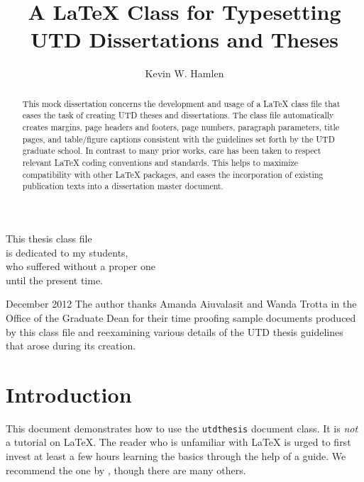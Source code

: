 \documentclass[doublespacing]{utdthesis}
\author{Kevin W. Hamlen}
\title{A LaTeX Class for Typesetting \\ UTD Dissertations and Theses}
\begin{document}
\frontmatter

\signaturepage
{} %

\begin{dedication} %
This thesis class file \\
is dedicated to my students, \\
who suffered without a proper one \\
until the present time.
\end{dedication}

\maketitle

\begin{acks}{December 2012} %
The author thanks Amanda Aiuvalasit and Wanda Trotta in the Office of the
Graduate Dean for their time proofing sample documents produced by this
class file and reexamining various details of the UTD thesis guidelines
that arose during its creation.
\end{acks}

\begin{abstract}
This mock dissertation concerns the development and usage of a \LaTeX{}
class file that eases the task of creating UTD theses and dissertations.
The class file automatically creates margins, page headers and footers, page
numbers, paragraph parameters, title pages, and table/figure captions
consistent with the guidelines set forth by the UTD graduate school.
In contrast to many prior works, care has been taken to respect relevant
\LaTeX{} coding conventions and standards.
This helps to maximize compatibility with other \LaTeX{} packages, and
eases the incorporation of existing publication texts into a dissertation
master document.
\end{abstract}

\tableofcontents
\listoffigures %
\listoftables %

\mainmatter

\chapter{Introduction}
\label{c:intro}

This document demonstrates how to use the \texttt{utdthesis} document class.
It is \emph{not} a tutorial on \LaTeX.
The reader who is unfamiliar with \LaTeX{} is urged to first invest at least
a few hours learning the basics through the help of a guide.
We recommend the one by \citet{oetiker}, though there are many others.
\end{document}
